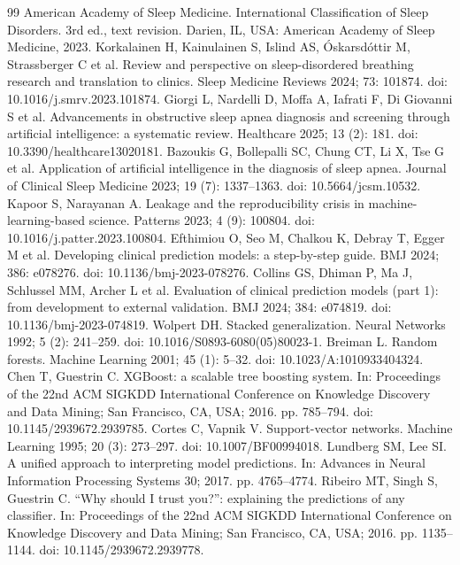 \documentclass{elektr}
\begin{document}
\begingroup
\footnotesize
\setlength{\itemsep}{0pt}
\begin{thebibliography}{99}
 American Academy of Sleep Medicine. International Classification of Sleep Disorders. 3rd ed., text revision. Darien, IL, USA: American Academy of Sleep Medicine, 2023.
 Korkalainen H, Kainulainen S, Islind AS, {\'{O}}skarsd{\'{o}}ttir M, Strassberger C et al. Review and perspective on sleep-disordered breathing research and translation to clinics. Sleep Medicine Reviews 2024; 73: 101874. doi: 10.1016/j.smrv.2023.101874.
 Giorgi L, Nardelli D, Moffa A, Iafrati F, Di Giovanni S et al. Advancements in obstructive sleep apnea diagnosis and screening through artificial intelligence: a systematic review. Healthcare 2025; 13 (2): 181. doi: 10.3390/healthcare13020181.
 Bazoukis G, Bollepalli SC, Chung CT, Li X, Tse G et al. Application of artificial intelligence in the diagnosis of sleep apnea. Journal of Clinical Sleep Medicine 2023; 19 (7): 1337--1363. doi: 10.5664/jcsm.10532.
 Kapoor S, Narayanan A. Leakage and the reproducibility crisis in machine-learning-based science. Patterns 2023; 4 (9): 100804. doi: 10.1016/j.patter.2023.100804.
 Efthimiou O, Seo M, Chalkou K, Debray T, Egger M et al. Developing clinical prediction models: a step-by-step guide. BMJ 2024; 386: e078276. doi: 10.1136/bmj-2023-078276.
 Collins GS, Dhiman P, Ma J, Schlussel MM, Archer L et al. Evaluation of clinical prediction models (part 1): from development to external validation. BMJ 2024; 384: e074819. doi: 10.1136/bmj-2023-074819.
 Wolpert DH. Stacked generalization. Neural Networks 1992; 5 (2): 241--259. doi: 10.1016/S0893-6080(05)80023-1.
 Breiman L. Random forests. Machine Learning 2001; 45 (1): 5--32. doi: 10.1023/A:1010933404324.
 Chen T, Guestrin C. XGBoost: a scalable tree boosting system. In: Proceedings of the 22nd ACM SIGKDD International Conference on Knowledge Discovery and Data Mining; San Francisco, CA, USA; 2016. pp. 785--794. doi: 10.1145/2939672.2939785.
 Cortes C, Vapnik V. Support-vector networks. Machine Learning 1995; 20 (3): 273--297. doi: 10.1007/BF00994018.
 Lundberg SM, Lee SI. A unified approach to interpreting model predictions. In: Advances in Neural Information Processing Systems 30; 2017. pp. 4765--4774.
 Ribeiro MT, Singh S, Guestrin C. ``Why should I trust you?'': explaining the predictions of any classifier. In: Proceedings of the 22nd ACM SIGKDD International Conference on Knowledge Discovery and Data Mining; San Francisco, CA, USA; 2016. pp. 1135--1144. doi: 10.1145/2939672.2939778.

\end{thebibliography}
\end{document}
